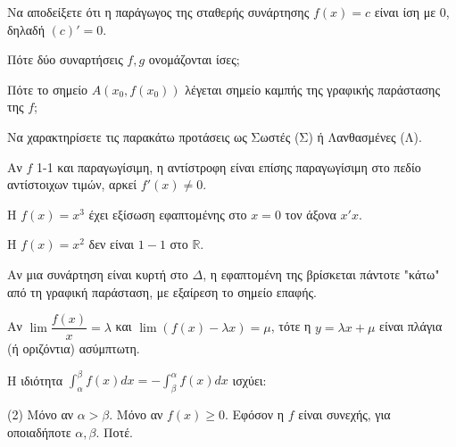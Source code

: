 \documentclass[11pt,a4paper]{article}
\newcommand{\kerkissans}[1]{{\fontfamily{maksf}\selectfont \textbf{#1}}}
\renewcommand{\textdexiakeraia}{}
\newcommand{\dint}{\displaystyle\int}
\newcommand\themanum{A}
\newcounter{thema}[section]
\renewcommand{\thethema}{\arabic{thema}}
\newcommand{\Thema}{\refstepcounter{thema}{\textbf{\textcolor{black}{\faPenSquare\ \  \large \kerkissans{\textbf{\thethemaο\hspace{2mm}Διαγώνισμα - Θέμα \themanum}}}}}\hspace{0mm}}{}
\newenvironment{thema}[1]
{\begin{tcolorbox}[title=\Thema\kerkissans{\textbf{\large{  #1}}},breakable,
enhanced standard,titlerule=0pt,toprule=0pt, rightrule=0pt, bottomrule=0pt,
colback=white,left=0mm,top=1mm,bottom=0mm,
boxrule=0pt,
colframe=white,leftrule=0mm,sharp corners,coltitle=black]
\renewcommand{\themanum}{#1}}
{\end{tcolorbox}}
\begin{document}
\begin{thema}{A}
\begin{erwthma}
    \item Να αποδείξετε ότι η παράγωγος της σταθερής συνάρτησης $f(x) = c$ είναι ίση με $0$, δηλαδή $(c)' = 0$.
    \item Πότε δύο συναρτήσεις $f, g$ ονομάζονται ίσες;
    \item Πότε το σημείο $A(x_0, f(x_0))$ λέγεται σημείο καμπής της γραφικής παράστασης της $f$;
    \item Να χαρακτηρίσετε τις παρακάτω προτάσεις ως Σωστές (Σ) ή Λανθασμένες (Λ).
    \begin{alist}
        \item Αν $f$ 1-1 και παραγωγίσιμη, η αντίστροφη είναι επίσης παραγωγίσιμη στο πεδίο αντίστοιχων τιμών, αρκεί $f'(x) \ne 0$.
        \item Η $f(x)=x^3$ έχει εξίσωση εφαπτομένης στο $x=0$ τον άξονα $x'x$.
        \item H $f(x)=x^2$ δεν είναι $1-1$ στο $\mathbb{R}$.
        \item Αν μια συνάρτηση είναι κυρτή στο $\Delta$, η εφαπτομένη της βρίσκεται πάντοτε "κάτω" από τη γραφική παράσταση, με εξαίρεση το σημείο επαφής.
        \item Αν $\lim \dfrac{f(x)}{x} = \lambda$ και $\lim (f(x)-\lambda x) = \mu$, τότε η $y=\lambda x + \mu$ είναι πλάγια (ή οριζόντια) ασύμπτωτη.
    \end{alist}
    \item Η ιδιότητα $\dint_\alpha^\beta f(x) dx = - \dint_\beta^\alpha f(x) dx$ ισχύει:
    \begin{tasks}[label=\let\textdexiakeraia\relax\alph*.](2)
        \task Μόνο αν $\alpha > \beta$.
        \task Μόνο αν $f(x) \ge 0$.
        \task Εφόσον η $f$ είναι συνεχής, για οποιαδήποτε $\alpha, \beta$.
        \task Ποτέ.
    \end{tasks}
\end{erwthma}
\end{thema}
\vspace{1cm}
\end{document}
